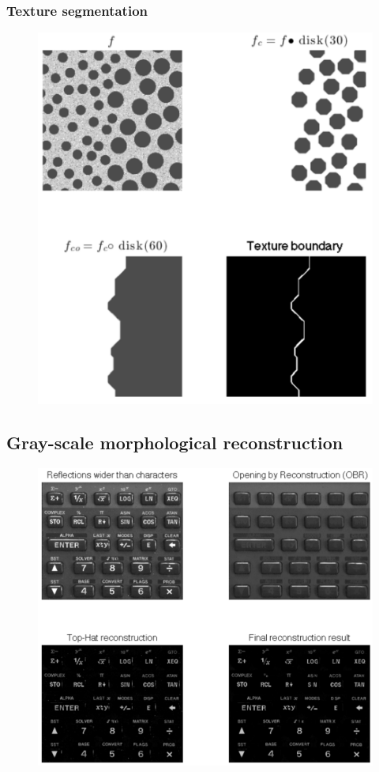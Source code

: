 \begin{frame}
\frametitle{Texture segmentation}
\begin{figure}[!h]
\includegraphics[width=.5\textwidth]{textureSegmentation.png}
\end{figure}
\end{frame}

\subsection{Gray-scale morphological reconstruction}

\begin{frame}
\begin{figure}[!h]
\includegraphics[width=.6\textwidth]{gs-reconstruction.png}
\end{figure}
\end{frame}


